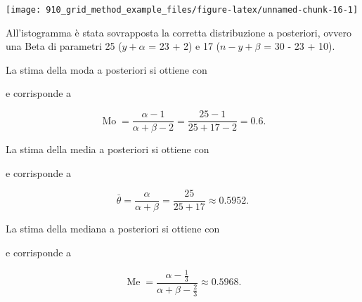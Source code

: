 \documentclass[
]{memoir}
\newenvironment{Shaded}{\begin{snugshade}}{\end{snugshade}}
\newcommand{\CommentTok}[1]{\textcolor[rgb]{0.56,0.35,0.01}{\textit{#1}}}
\newcommand{\FunctionTok}[1]{\textcolor[rgb]{0.00,0.00,0.00}{#1}}
\newcommand{\NormalTok}[1]{#1}
\newcommand{\SpecialCharTok}[1]{\textcolor[rgb]{0.00,0.00,0.00}{#1}}
\DeclareMathOperator{\Me}{Me} %
\DeclareMathOperator{\Mo}{Mo} %
\begin{document}
\begin{center}\texttt{[image: 910\_grid\_method\_example\_files/figure-latex/unnamed-chunk-16-1]} \end{center}

\noindent
All'istogramma è stata sovrapposta la corretta distribuzione a posteriori, ovvero una Beta di parametri 25 (\(y + \alpha\) = 23 + 2) e 17 (\(n - y + \beta\) = 30 - 23 + 10).

La stima della moda a posteriori si ottiene con

\begin{Shaded}
\end{Shaded}

\noindent e corrisponde a

\[
\Mo = \frac{\alpha -1}{\alpha + \beta - 2} = \frac{25 - 1}{25 + 17 - 2} = 0.6.
\]

La stima della media a posteriori si ottiene con

\begin{Shaded}
\end{Shaded}

\noindent e corrisponde a

\[
\bar{\theta} = \frac{\alpha}{\alpha + \beta} = \frac{25}{25 + 17} \approx 0.5952.
\]

La stima della mediana a posteriori si ottiene con

\begin{Shaded}
\end{Shaded}

\noindent e corrisponde a

\[
\Me = \frac{\alpha - \frac{1}{3}}{\alpha + \beta - \frac{2}{3}} \approx 0.5968.
\]

  
\end{document}
